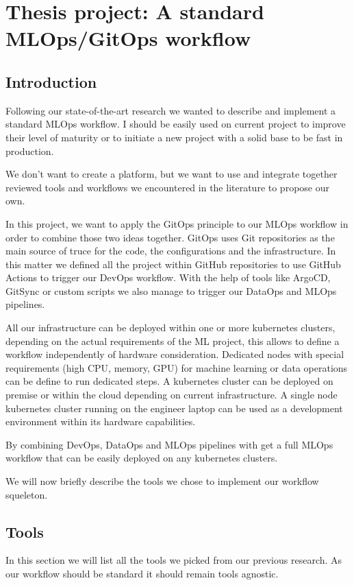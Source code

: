 \chapter{Thesis project: A standard MLOps/GitOps workflow}\label{ch:thesis-project:-a-standard-mlops-ci/cd-workflow}
\section{Introduction}\label{sec:introduction}
Following our state-of-the-art research we wanted to describe and implement a standard MLOps workflow.
I should be easily used on current project to improve their level of maturity or to initiate a new project with a solid
base to be fast in production.

We don't want to create a platform, but we want to use and integrate together reviewed
tools and workflows we encountered in the literature to propose our own.

In this project, we want to apply the GitOps principle to our MLOps workflow in order to combine those two ideas together.
GitOps uses Git repositories as the main source of truce for the code, the configurations and the infrastructure.
In this matter we defined all the project within GitHub repositories to use GitHub Actions to trigger our DevOps workflow.
With the help of tools like ArgoCD, GitSync or custom scripts we also manage to trigger our DataOps and MLOps pipelines.

All our infrastructure can be deployed within one or more kubernetes clusters, depending on the actual requirements of
the ML project, this allows to define a workflow independently of hardware consideration.
Dedicated nodes with special requirements (high CPU, memory, GPU) for machine learning or data operations can be define
to run dedicated steps.
A kubernetes cluster can be deployed on premise or within the cloud depending on current infrastructure.
A single node kubernetes cluster running on the engineer laptop can be used as a development environment
within its hardware capabilities.

By combining DevOps, DataOps and MLOps pipelines with get a full MLOps workflow that can be easily deployed on any kubernetes clusters.

We will now briefly describe the tools we chose to implement our workflow squeleton.

\section{Tools}\label{sec:tools2}
In this section we will list all the tools we picked from our previous research.
As our workflow should be standard it should remain tools agnostic.


